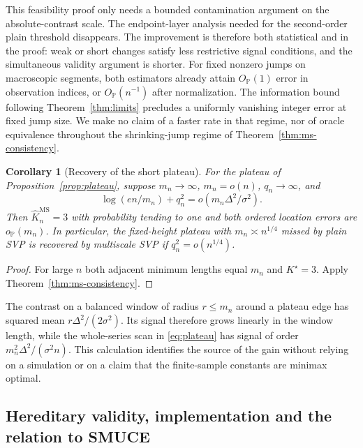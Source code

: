 \documentclass[pdflatex,sn-mathphys-num]{sn-jnl}
\newcommand{\Prob}{\mathbb P}
\theoremstyle{thmstyleone}
\newtheorem{corollary}[theorem]{Corollary}
\theoremstyle{thmstyletwo}
\begin{document}
This feasibility proof only needs a bounded contamination argument on the
absolute-contrast scale. The endpoint-layer analysis needed for the
second-order plain threshold disappears. The improvement is therefore
both statistical and in the proof: weak or short changes satisfy less
restrictive signal conditions, and the simultaneous validity argument is
shorter. For fixed nonzero jumps on macroscopic segments, both estimators
already attain $O_{\Prob}(1)$ error in observation indices, or
$O_{\Prob}(n^{-1})$ after normalization. The information bound following
Theorem~\ref{thm:limits} precludes a uniformly vanishing integer error at
fixed jump size. We make no claim of a faster rate in that regime, nor of
oracle equivalence throughout the shrinking-jump regime of
Theorem~\ref{thm:ms-consistency}.

\begin{corollary}[Recovery of the short plateau]\label{cor:ms-plateau}
For the plateau of Proposition~\ref{prop:plateau}, suppose
$m_n\to\infty$, $m_n=o(n)$, $q_n\to\infty$, and
\begin{equation}\label{eq:ms-plateau}
\log(en/m_n)+q_n^2=o(m_n\Delta^2/\sigma^2).
\end{equation}
Then $\widehat K_n^{\mathrm{MS}}=3$ with probability tending to one and
both ordered location errors are $o_{\Prob}(m_n)$.
In particular, the fixed-height plateau with $m_n\asymp n^{1/4}$ missed by
plain SVP is recovered by multiscale SVP if $q_n^2=o(n^{1/4})$.
\end{corollary}
\begin{proof}
For large $n$ both adjacent minimum lengths equal $m_n$ and $K^\star=3$.
Apply Theorem~\ref{thm:ms-consistency}.
\end{proof}

The contrast on a balanced window of radius $r\le m_n$ around a plateau
edge has squared mean $r\Delta^2/(2\sigma^2)$. Its signal therefore grows
linearly in the window length, while the whole-series scan in
\eqref{eq:plateau} has signal of order $m_n^2\Delta^2/(\sigma^2n)$.
This calculation identifies the source of the gain without relying on a
simulation or on a claim that the finite-sample constants are minimax optimal.

\subsection{Hereditary validity, implementation and the relation to SMUCE}
\end{document}

